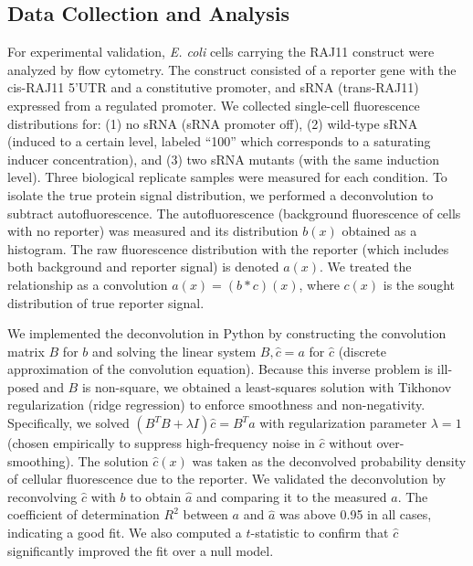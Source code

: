 \subsection*{Data Collection and Analysis}
For experimental validation, \textit{E. coli} cells carrying the RAJ11 construct were analyzed by flow cytometry. The construct consisted of a reporter gene with the cis-RAJ11 5'UTR and a constitutive promoter, and sRNA (trans-RAJ11) expressed from a regulated promoter. We collected single-cell fluorescence distributions for: (1) no sRNA (sRNA promoter off), (2) wild-type sRNA (induced to a certain level, labeled ``100'' which corresponds to a saturating inducer concentration), and (3) two sRNA mutants (with the same induction level). Three biological replicate samples were measured for each condition. To isolate the true protein signal distribution, we performed a deconvolution to subtract autofluorescence. The autofluorescence (background fluorescence of cells with no reporter) was measured and its distribution $b(x)$ obtained as a histogram. The raw fluorescence distribution with the reporter (which includes both background and reporter signal) is denoted $a(x)$. We treated the relationship as a convolution $a(x) = (b * c)(x)$, where $c(x)$ is the sought distribution of true reporter signal.

We implemented the deconvolution in Python by constructing the convolution matrix $B$ for $b$ and solving the linear system $B,\hat{c} = a$ for $\hat{c}$ (discrete approximation of the convolution equation). Because this inverse problem is ill-posed and $B$ is non-square, we obtained a least-squares solution with Tikhonov regularization (ridge regression) to enforce smoothness and non-negativity. Specifically, we solved $(B^T B + \lambda I)\hat{c} = B^T a$ with regularization parameter $\lambda=1$ (chosen empirically to suppress high-frequency noise in $\hat{c}$ without over-smoothing). The solution $\hat{c}(x)$ was taken as the deconvolved probability density of cellular fluorescence due to the reporter. We validated the deconvolution by reconvolving $\hat{c}$ with $b$ to obtain $\hat{a}$ and comparing it to the measured $a$. The coefficient of determination $R^2$ between $a$ and $\hat{a}$ was above 0.95 in all cases, indicating a good fit. We also computed a $t$-statistic to confirm that $\hat{c}$ significantly improved the fit over a null model. 

